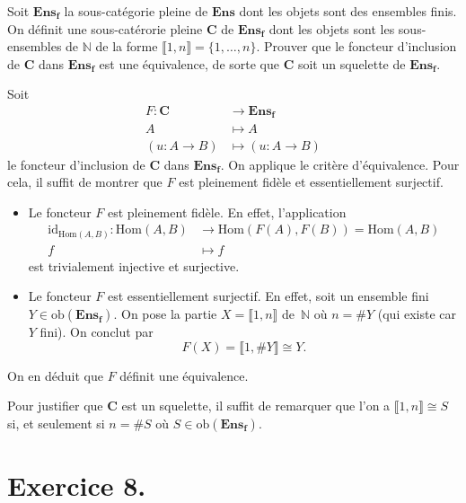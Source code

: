 \documentclass{../../td}
\begin{document}
  \begin{slshape}
    \color{deepblue}
    Soit $\mathbf{Ens_f}$ la sous-catégorie pleine de $\mathbf{Ens}$ dont les objets sont des ensembles finis.
    On définit une sous-catérorie pleine $\mathbf{C}$ de $\mathbf{Ens_f}$ dont les objets sont les sous-ensembles de $\mathds{N}$ de la forme $\llbracket 1, n \rrbracket = \{1,\ldots,n\}$.
    Prouver que le foncteur d'inclusion de $\mathbf{C}$ dans $\mathbf{Ens_f}$ est une équivalence, de sorte que $\mathbf{C}$ soit un squelette de $\mathbf{Ens_f}$.
  \end{slshape}

  Soit \begin{align*}
    F: \mathbf{C} &\longrightarrow \mathbf{Ens_f} \\
    A &\longmapsto A\\
    (u : A \to B) &\longmapsto (u : A \to B)
  \end{align*}
  le foncteur d'inclusion de $\mathbf{C}$ dans $\mathbf{Ens_f}$.
  On applique le critère d'équivalence.
  Pour cela, il suffit de montrer que $F$ est pleinement fidèle et essentiellement surjectif.

  \begin{itemize}
    \item Le foncteur $F$ est pleinement fidèle.
      En effet, l'application 
      \begin{align*}
        \mathrm{id}_{\mathrm{Hom}(A,B)}: \mathrm{Hom}(A,B) &\longrightarrow \mathrm{Hom}(F(A),F(B)) = \mathrm{Hom}(A,B) \\
        f &\longmapsto f
      \end{align*}
      est trivialement injective et surjective.
    \item Le foncteur $F$ est essentiellement surjectif.
      En effet, soit un ensemble fini $Y \in \mathrm{ob}(\mathbf{Ens_f})$.
      On pose la partie $X = \llbracket 1, n \rrbracket$ de~$\mathds{N}$ où $n = \# Y$ (qui existe car $Y$ fini).
      On conclut par  \[ F(X) = \llbracket 1, \# Y \rrbracket \cong Y. \]
  \end{itemize}
  On en déduit que $F$ définit une équivalence.

  Pour justifier que $\mathbf{C}$ est un squelette, il suffit de remarquer que l'on a $\llbracket 1, n \rrbracket \cong S$ si, et seulement si $n = \# S$ où $S \in \mathrm{ob}(\mathbf{Ens_f})$.



  \chapter{Exercice 8.}
\end{document}
